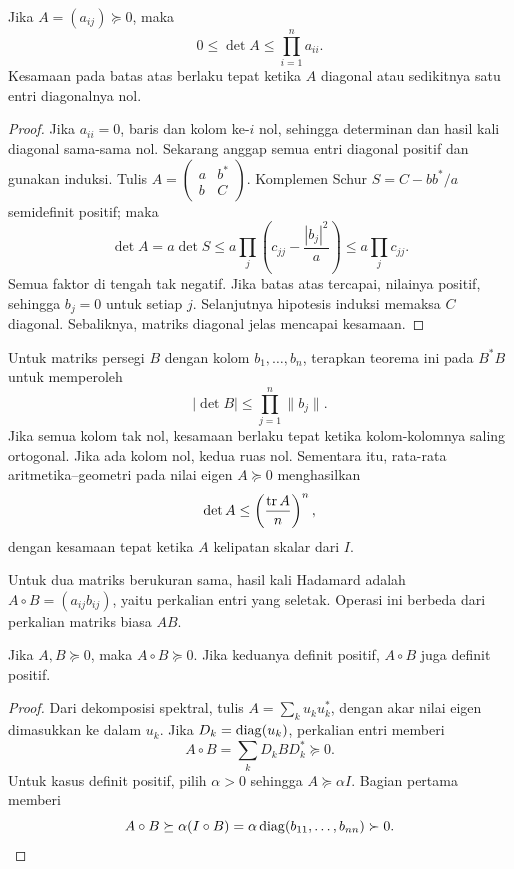 \begin{teorema}
    Jika $A=(a_{ij})\succeq0$, maka
    \[
        0\le\det A\le\prod_{i=1}^n a_{ii}.
    \]
    Kesamaan pada batas atas berlaku tepat ketika $A$ diagonal
    atau sedikitnya satu entri diagonalnya nol.
\end{teorema}
\begin{proof}
    Jika $a_{ii}=0$, baris dan kolom ke-$i$ nol, sehingga
    determinan dan hasil kali diagonal sama-sama nol.
    Sekarang anggap semua entri diagonal positif dan gunakan induksi.
    Tulis $A=\begin{pmatrix}a&b^*\\b&C\end{pmatrix}$.
    Komplemen Schur $S=C-bb^*/a$ semidefinit positif; maka
    \[
        \det A=a\det S
        \le a\prod_j\left(c_{jj}-\frac{|b_j|^2}{a}\right)
        \le a\prod_j c_{jj}.
    \]
    Semua faktor di tengah tak negatif. Jika batas atas tercapai,
    nilainya positif, sehingga $b_j=0$ untuk setiap $j$.
    Selanjutnya hipotesis induksi memaksa $C$ diagonal.
    Sebaliknya, matriks diagonal jelas mencapai kesamaan.
\end{proof}

Untuk matriks persegi $B$ dengan kolom $b_1,\ldots,b_n$, terapkan
teorema ini pada $B^*B$ untuk memperoleh
\[
    |\det B|\le\prod_{j=1}^n\|b_j\|.
\]
Jika semua kolom tak nol, kesamaan berlaku tepat ketika
kolom-kolomnya saling ortogonal. Jika ada kolom nol, kedua ruas nol.
Sementara itu, rata-rata aritmetika--geometri pada nilai eigen
$A\succeq0$ menghasilkan
\[
    \det A\le\left(\frac{\operatorname{tr} A}{n}\right)^n,
\]
dengan kesamaan tepat ketika $A$ kelipatan skalar dari $I$.

\begin{definisi}
    Untuk dua matriks berukuran sama, hasil kali Hadamard adalah
    $A\circ B=(a_{ij}b_{ij})$, yaitu perkalian entri yang seletak.
    Operasi ini berbeda dari perkalian matriks biasa $AB$.
\end{definisi}

\begin{teorema}
    Jika $A,B\succeq0$, maka $A\circ B\succeq0$.
    Jika keduanya definit positif, $A\circ B$ juga definit positif.
\end{teorema}
\begin{proof}
    Dari dekomposisi spektral, tulis $A=\sum_k u_ku_k^*$,
    dengan akar nilai eigen dimasukkan ke dalam $u_k$.
    Jika $D_k=\operatorname{diag}(u_k)$, perkalian entri memberi
    \[
        A\circ B=\sum_k D_kBD_k^*\succeq0.
    \]
    Untuk kasus definit positif, pilih $\alpha>0$ sehingga
    $A\succeq\alpha I$. Bagian pertama memberi
    \[
        A\circ B\succeq\alpha(I\circ B)
           =\alpha\operatorname{diag}(b_{11},\ldots,b_{nn})\succ0.
    \]
\end{proof}

